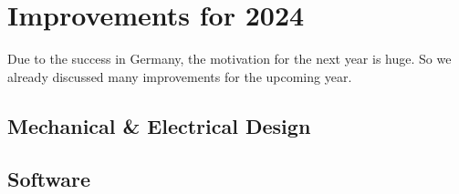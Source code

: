 \section{Improvements for 2024}
Due to the success in Germany, the motivation for the next year is huge. So we already discussed
many improvements for the upcoming year. 

\subsection{Mechanical \& Electrical Design}


\subsection{Software}